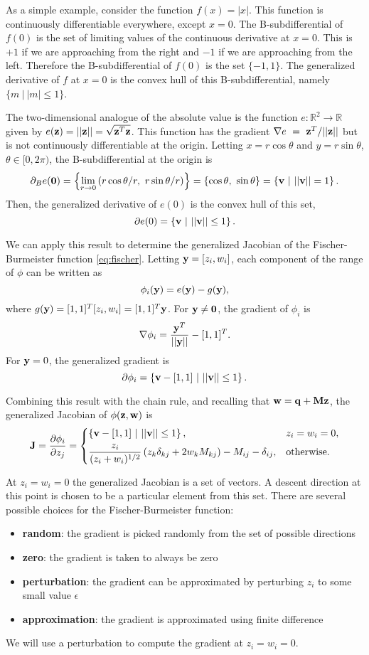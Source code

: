 As a simple example, consider the function $f(x) = |x|$. This function is continuously differentiable everywhere, except $x=0$. The B-subdifferential of $f(0)$ is the set of limiting values of the continuous derivative at $x=0$. This is $+1$ if we are approaching from the right and $-1$ if we are approaching from the left. Therefore the B-subdifferential of $f(0)$ is the set $\{-1, 1\}$. The generalized derivative of $f$ at $x=0$ is the convex hull of this B-subdifferential, namely $\{m~|~|m| \leq 1\}$.

The two-dimensional analogue of the absolute value is the function $e:\mathbb{R}^2\to\mathbb{R}$ given by  $e({\mathbf{z}}) = ||{\mathbf{z}}|| = \sqrt{{\mathbf{z}}^T {\mathbf{z}}}$. This function has the gradient $\nabla e~=~{\mathbf{z}}^T/||{\mathbf{z}}||$ but is not continuously differentiable at the origin. Letting $x=r\cos\theta$ and $y=r\sin\theta$, $\theta\in [0,2\pi)$,  the B-subdifferential at the origin is
\[ \partial_B e(\mathbf{0}) = \left\{\lim\limits_{r\to 0} \left(r\cos\theta/r, ~r\sin\theta/r\right)\right\} = \left\{\cos\theta, ~\sin\theta\right\} = \left\{{\mathbf{v}} ~|~||{\mathbf{v}}|| = 1\right\}.\]
Then, the generalized derivative of $e(0)$ is the convex hull of this set,
\[ \partial e(0) = \left\{ {\mathbf{v}} ~|~||{\mathbf{v}}||\leq 1\right\}.\]

We can apply this result to determine the generalized Jacobian of the Fischer-Burmeister function \eqref{eq:fischer}. Letting ${\mathbf{y}} = [z_i, w_i]$, each component of the range of $\phi$ can be written as
\[ \phi_i({\mathbf{y}}) = e({\mathbf{y}}) - g({\mathbf{y}}),\]
where $g({\mathbf{y}}) = [1,1]^T [z_i, w_i] = [1,1]^T {\mathbf{y}}$. For ${\mathbf{y}}\ne \mathbf{0}$, the gradient of $\phi_i$ is
\[ \nabla\phi_i = \frac{{\mathbf{y}}^T}{||{\mathbf{y}}||} - [1,1]^T.\] 
For ${\mathbf{y}}=0$, the generalized gradient is 
\[ \partial \phi_i = \left\{ {\mathbf{v}} - [1,1]~|~||{\mathbf{v}}||\leq 1\right\}.\]

Combining this result with the chain rule, and recalling that ${\mathbf{w}} = {\mathbf{q}} + {\mathbf{M}}{\mathbf{z}}$,  the generalized Jacobian of $\phi({\mathbf{z}},{\mathbf{w}})$ is
\[ {\mathbf{J}} = \frac{\partial \phi_i}{\partial z_j} = \begin{dcases}
			 \left\{ {\mathbf{v}} - [1,1]~|~||{\mathbf{v}}||\leq 1\right\}, & z_i = w_i = 0,\\
			 \dfrac{z_i}{(z_i + w_i)^{1/2}}\left( z_k\delta_{kj} + 2w_k M_{kj}\right) - M_{ij} - \delta_{ij}, & \text{otherwise.}
			 \end{dcases}
			 \]

At $z_i = w_i = 0$ the generalized Jacobian is a set of vectors. A descent direction at this point is chosen to be a particular element from this set. There are several possible choices for the Fischer-Burmeister function:
\begin{itemize}
	\item \textbf{random}: the gradient is picked randomly from the set of possible directions
	\item \textbf{zero}: the gradient is taken to always be zero
	\item \textbf{perturbation}: the gradient can be approximated by perturbing $z_i$ to some small value $\epsilon$
	\item \textbf{approximation}: the gradient is approximated using finite difference
\end{itemize}
We will use a perturbation to compute the gradient at $z_i = w_i = 0$.

